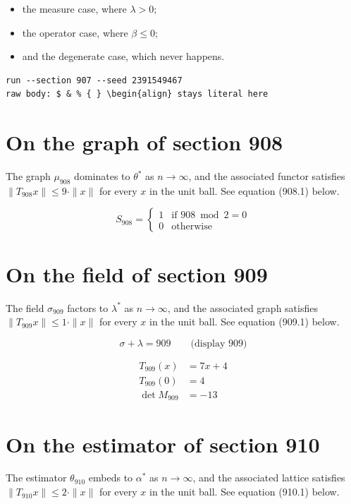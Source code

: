 \documentclass{article}
\begin{document}
\begin{itemize}
  \item the measure case, where $\lambda > 0$;
  \item the operator case, where $\beta \leq 0$;
  \item and the degenerate case, which never happens.
\end{itemize}

\begin{verbatim}
run --section 907 --seed 2391549467
raw body: $ & % { } \begin{align} stays literal here
\end{verbatim}

\section{On the graph of section 908}
The graph $\mu_{908}$ dominates to $\theta^{*}$ as $n \to \infty$,
and the associated functor satisfies $\|T_{908} x\| \leq 9 \cdot \|x\|$
for every $x$ in the unit ball. See equation (908.1) below.

\begin{equation}
S_{908} = \begin{cases} 1 & \text{if } 908 \bmod 2 = 0 \\ 0 & \text{otherwise} \end{cases}
\end{equation}

\section{On the field of section 909}
The field $\sigma_{909}$ factors to $\lambda^{*}$ as $n \to \infty$,
and the associated graph satisfies $\|T_{909} x\| \leq 1 \cdot \|x\|$
for every $x$ in the unit ball. See equation (909.1) below.

$$
\sigma + \lambda = 909 \qquad \text{(display 909)}
$$

\begin{align}
T_{909}(x) &= 7 x + 4 \\
T_{909}(0) &= 4 \\
\det M_{909} &= -13
\end{align}

\section{On the estimator of section 910}
The estimator $\theta_{910}$ embeds to $\alpha^{*}$ as $n \to \infty$,
and the associated lattice satisfies $\|T_{910} x\| \leq 2 \cdot \|x\|$
for every $x$ in the unit ball. See equation (910.1) below.
\end{document}
